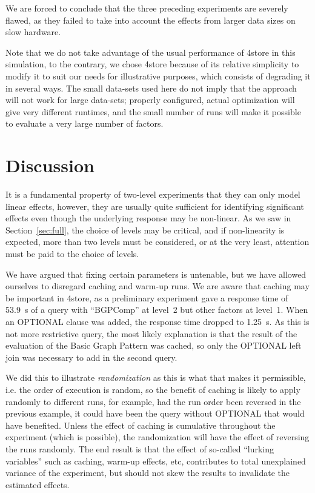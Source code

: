 \documentclass{llncs}
\begin{document}
We are forced to conclude that the three preceding experiments are
severely flawed, as they failed to take into account the effects from
larger data sizes on slow hardware.


Note that we do not take advantage of the usual performance of 4store
in this simulation, to the contrary, we chose 4store because of its
relative simplicity to modify it to suit our needs for illustrative
purposes, which consists of degrading it in several ways. The small
data-sets used here do not imply that the approach will not work for
large data-sets; properly configured, actual optimization will give
very different runtimes, and the small number of runs will make it
possible to evaluate a very large number of factors.



\section{Discussion}

It is a fundamental property of two-level experiments that they can
only model linear effects, however, they are usually quite sufficient
for identifying significant effects even though the underlying
response may be non-linear.  As we saw in Section~\ref{sec:full}, the
choice of levels may be critical, and if non-linearity is expected,
more than two levels must be considered, or at the very least,
attention must be paid to the choice of levels.

We have argued that fixing certain parameters is untenable, but we
have allowed ourselves to disregard caching and warm-up runs. We are
aware that caching may be important in 4store, as a preliminary
experiment gave a response time of 53.9~s of a query with ``BGPComp''
at level~2 but other factors at level~1. When an OPTIONAL clause was
added, the response time dropped to 1.25~s. As this is not more
restrictive query, the most likely explanation is that the result of
the evaluation of the Basic Graph Pattern was cached, so only the
OPTIONAL left join was necessary to add in the second query.

We did this to illustrate \emph{randomization} as this is what that
makes it permissible, i.e. the order of execution is random, so the
benefit of caching is likely to apply randomly to different runs, for
example, had the run order been reversed in the previous example, it
could have been the query without OPTIONAL that would have
benefited. Unless the effect of caching is cumulative throughout the
experiment (which is possible), the randomization will have the effect
of reversing the runs randomly. The end result is that the effect of
so-called ``lurking variables'' such as caching, warm-up effects, etc,
contributes to total unexplained variance of the experiment, but
should not skew the results to invalidate the estimated effects.
\end{document}
